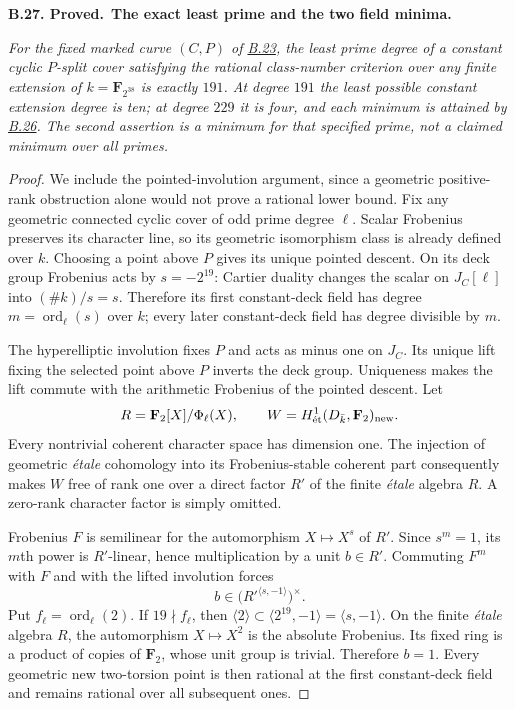 \documentclass[11pt,a4paper]{article}
\newcommand{\et}{\text{ét}}
\newenvironment{claim}[3]{\par\medskip\noindent\hypertarget{#1}{\textbf{#1. #2.}}\ \textbf{#3.}\par\nopagebreak\smallskip\begingroup\itshape}{\endgroup\par\smallskip}
\newcommand{\statementref}[1]{\hyperlink{#1}{#1}}
\begin{document}
\begin{claim}{B.27}{Proved}{The exact least prime and the two field minima}
For the fixed marked curve $(C,P)$ of \statementref{B.23}, the
least prime degree of a constant cyclic $P$-split cover satisfying
the rational class-number criterion over any finite extension
of $k=\mathbf F_{2^{38}}$ is exactly $191$.
At degree $191$ the least possible constant extension degree is ten;
at degree $229$ it is four, and each minimum is attained by
\statementref{B.26}. The second assertion is a minimum for that
specified prime, not a claimed minimum over all primes.
\end{claim}
\begin{proof}
We include the pointed-involution argument, since a geometric
positive-rank obstruction alone would not prove a rational
lower bound. Fix any geometric connected cyclic cover of odd
prime degree $\ell$. Scalar Frobenius preserves its character
line, so its geometric isomorphism class is already defined
over $k$. Choosing a point above $P$ gives its unique pointed
descent. On its deck group Frobenius acts by $s=-2^{19}$:
Cartier duality changes the scalar on $J_C[\ell]$ into
$(\#k)/s=s$. Therefore its first constant-deck field has degree
$m=\operatorname{ord}_\ell(s)$ over $k$; every later
constant-deck field has degree divisible by $m$.

The hyperelliptic involution fixes $P$ and acts as minus one
on $J_C$. Its unique lift fixing the selected point above $P$
inverts the deck group. Uniqueness makes the lift commute with
the arithmetic Frobenius of the pointed descent. Let
\[
 R=\mathbf F_2[X]/\Phi_\ell(X),\qquad
 W=H^1_{\et}(D_{\bar k},\mathbf F_2)_{\rm new}.
\]
Every nontrivial coherent character space has dimension one.
The injection of geometric \emph{\'etale} cohomology into its
Frobenius-stable coherent part consequently makes $W$ free
of rank one over a direct factor $R'$ of the finite \emph{\'etale}
algebra $R$. A zero-rank character factor is simply omitted.

Frobenius $F$ is semilinear for the automorphism $X\mapsto X^s$
of $R'$. Since $s^m=1$, its $m$th power is $R'$-linear, hence
multiplication by a unit $b\in R'$. Commuting $F^m$ with $F$
and with the lifted involution forces
\[
 b\in\bigl(R'^{\langle s,-1\rangle}\bigr)^\times.
\]
Put $f_\ell=\operatorname{ord}_\ell(2)$. If $19\nmid f_\ell$,
then $\langle2\rangle\subset\langle2^{19},-1\rangle
=\langle s,-1\rangle$. On the finite \emph{\'etale} algebra $R$,
the automorphism $X\mapsto X^2$ is the absolute Frobenius.
Its fixed ring is a product of copies of $\mathbf F_2$, whose
unit group is trivial. Therefore $b=1$. Every geometric new
two-torsion point is then rational at the first constant-deck
field and remains rational over all subsequent ones.


\end{proof}
\end{document}
